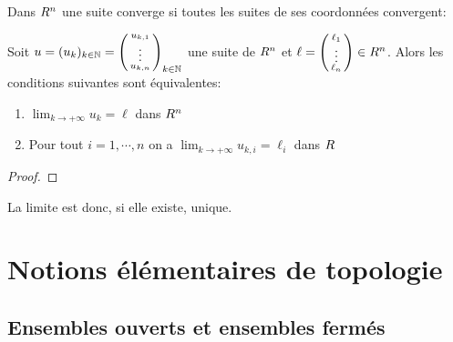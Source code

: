                                 \sld{\vfill\pagebreak[5]}%
                                \noindent Dans $R^n$ une suite converge si toutes les suites de ses coordonnées convergent:

                                \begin{proposition}
                                    Soit $u = (u_k)_{k\in\mathbb{N}} = \begin{psmallmatrix}u_{k,1}\\ \vdots \\ u_{k,n}\end{psmallmatrix}_{k\in\mathbb{N}}$ une suite de $R^n$ et $\ell = \begin{psmallmatrix} \ell_1\\\vdots\\\ell_n\end{psmallmatrix} \in R^n$. Alors les conditions suivantes sont équivalentes:
                                    \begin{enumerate}
                                        \item $\lim_{k\to +\infty} u_k = \ell$ dans $R^n$
                                        \item Pour tout $i=1,\cdots,n$ on a  $\lim_{k\to +\infty} u_{k,i} = \ell_i$ dans $R$
                                    \end{enumerate}
                                \end{proposition}

                                \begin{proof}
                                    \pl{\rep{8cm}	}

                                \end{proof}

                                \begin{remark}
                                    La limite est donc, si elle existe, unique.
                                \end{remark}

                                \sld{\vfill\pagebreak[5]}%
                                \section{Notions élémentaires de topologie}

                                \subsection{Ensembles ouverts et ensembles fermés}

